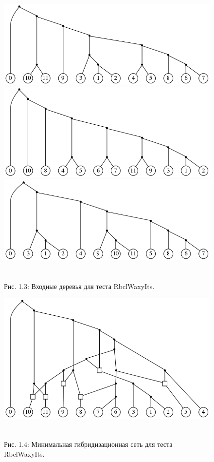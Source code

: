 \begin{figure}[h]
  \includegraphics[width=\linewidth]{img/Grass3RbclWaxyIts_tree0}
  \includegraphics[width=\linewidth]{img/Grass3RbclWaxyIts_tree1}
  \includegraphics[width=\linewidth]{img/Grass3RbclWaxyIts_tree2}
  \\\\\\
  \centering
  Рис. 1.3: Входные деревья для теста RbclWaxyIts.
\end{figure}

\begin{figure}[h]
  \includegraphics[width=\linewidth]{img/Grass3RbclWaxyIts}
  \\\\\\
  \centering
  Рис. 1.4: Минимальная гибридизационная сеть для теста RbclWaxyIts.
\end{figure}

